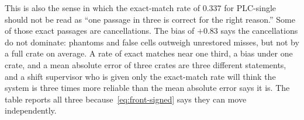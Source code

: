 This is also the sense in which the exact-match rate of $0.337$ for PLC-single should not be read as ``one passage in three is correct for the right reason.'' Some of those exact passages are cancellations. The bias of $+0.83$ says the cancellations do not dominate: phantoms and false cells outweigh unrestored misses, but not by a full crate on average. A rate of exact matches near one third, a bias under one crate, and a mean absolute error of three crates are three different statements, and a shift supervisor who is given only the exact-match rate will think the system is three times more reliable than the mean absolute error says it is. The table reports all three because~\eqref{eq:front-signed} says they can move independently.
